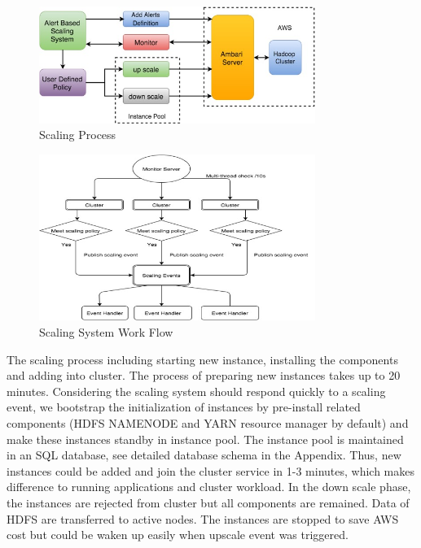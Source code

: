 \documentclass{article}
\begin{document}
\begin{figure}[ht!]
\centering
\includegraphics[width=0.8\textwidth,natwidth=1000,natheight=800]{scalingProcess.png}
\caption{Scaling Process}
\label{fig:scaleProcess}
\end{figure}
 
\begin{figure}[ht!]
 \centering
  \includegraphics[width=0.8\textwidth,natwidth=1000,natheight=800]{systemWorkFlow.png}
 \caption{Scaling System Work Flow}
 \label{fig:systemWorkflow}
 \end{figure}
The scaling process including starting new instance, installing the components and adding into cluster. The process of preparing new instances takes up to 20 minutes. Considering the scaling system should respond quickly to a scaling event, we bootstrap the initialization of instances by pre-install related components (HDFS NAMENODE and YARN resource manager by default) and make these instances standby in instance pool. The instance pool is maintained in an SQL database, see detailed database schema in the Appendix.  Thus, new instances could be added and join the cluster service in 1-3 minutes, which makes difference to running applications and cluster workload. In the down scale phase, the instances are rejected from cluster but all components are remained. Data of HDFS are transferred to active nodes. The instances are stopped to save AWS cost but could be waken up easily when upscale event was triggered. 
\end{document}
